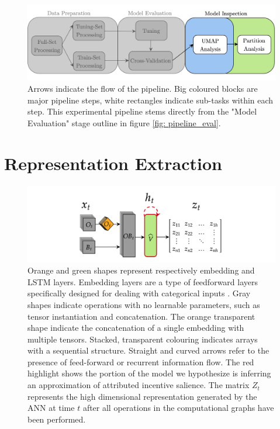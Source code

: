 \begin{figure}[h]
  \centering
  \includegraphics[width=\textwidth]{images/chapter_4/pipeline_inspect.png}
    \caption[\textbf{Model inspection experimental pipeline}]{Arrows indicate the flow of the pipeline. Big coloured blocks are major pipeline steps, white rectangles indicate sub-tasks within each step. This experimental pipeline stems directly from the "Model Evaluation" stage outline in figure \ref{fig: pipeline_eval}.}
    \label{fig: pipeline_inspect}
\end{figure}

\section{Representation Extraction}
\begin{figure}[h]
  \centering
  \includegraphics[width=\textwidth]{images/chapter_4/representation_extractor.png}
    \caption[\textbf{The procedure for generating latent representations generated by an ANN}]{Orange and green shapes represent respectively embedding and LSTM layers. Embedding layers are a type of feedforward layers specifically designed for dealing with categorical inputs \cite{chollet2015keras}. Gray shapes indicate operations with no learnable parameters, such as tensor instantiation and concatenation. The orange transparent shape indicate the concatenation of a single embedding with multiple tensors. Stacked, transparent colouring indicates arrays with a sequential structure. Straight and curved arrows refer to the presence of feed-forward or recurrent information flow. The red highlight shows the portion of the model we hypothesize is inferring an approximation of attributed incentive salience. The matrix $Z_t$ represents the high dimensional representation generated by the ANN at time $t$ after all operations in the computational graphs have been performed.}
    \label{fig: repr_exctracto}
    \end{figure}

